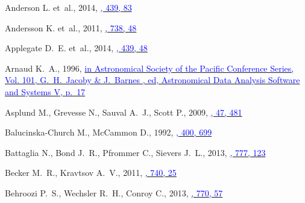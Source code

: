 \documentclass[useAMS,usenatbib,usegraphicx]{mn2e}
\begin{document}
\begin{thebibliography}{}
{Anderson} L. et~al., 2014,
  \href{http://adsabs.harvard.edu/abs/2014MNRAS.439...83A}{\textcolor{blue}{\mnras,
  439, 83}}

{Andersson} K. et~al., 2011,
  \href{http://adsabs.harvard.edu/abs/2011ApJ...738...48A}{\textcolor{blue}{\apj,
  738, 48}}

{Applegate} D.~E. et~al., 2014,
  \href{http://adsabs.harvard.edu/abs/2014MNRAS.439...48A}{\textcolor{blue}{\mnras,
  439, 48}}

{Arnaud} K.~A., 1996,
  \href{http://adsabs.harvard.edu/abs/1996ASPC..101...17A}{\textcolor{blue}{in
  Astronomical Society of the Pacific Conference Series, Vol. 101,
  {G.~H.~Jacoby \& J.~Barnes} , ed, Astronomical Data Analysis Software and
  Systems V, p.~17}}

{Asplund} M., {Grevesse} N., {Sauval} A.~J.,  {Scott} P., 2009,
  \href{http://adsabs.harvard.edu/abs/2009ARA%26A..47..481A}{\textcolor{blue}{\araa,
  47, 481}}

{Balucinska-Church} M.,  {McCammon} D., 1992,
  \href{http://adsabs.harvard.edu/abs/1992ApJ...400..699B}{\textcolor{blue}{\apj,
  400, 699}}

{Battaglia} N., {Bond} J.~R., {Pfrommer} C.,  {Sievers} J.~L., 2013,
  \href{http://adsabs.harvard.edu/abs/2013ApJ...777..123B}{\textcolor{blue}{\apj,
  777, 123}}

{Becker} M.~R.,  {Kravtsov} A.~V., 2011,
  \href{http://adsabs.harvard.edu/abs/2011ApJ...740...25B}{\textcolor{blue}{\apj,
  740, 25}}

{Behroozi} P.~S., {Wechsler} R.~H.,  {Conroy} C., 2013,
  \href{http://adsabs.harvard.edu/abs/2013ApJ...770...57B}{\textcolor{blue}{\apj,
  770, 57}}


\end{thebibliography}
\end{document}
